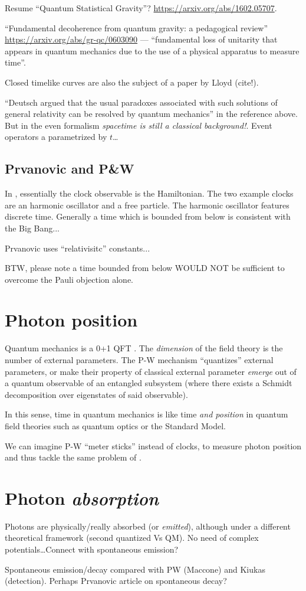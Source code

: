 Resume ``Quantum Statistical Gravity''? \url{https://arxiv.org/abs/1602.05707}.

``Fundamental decoherence from quantum gravity: a pedagogical review''
\url{https://arxiv.org/abs/gr-qc/0603090} ---
``fundamental loss of unitarity
that appears in quantum mechanics
due to the use of a physical apparatus to measure time''.

Closed timelike curves are also the subject of a paper by Lloyd (cite!).

``Deutsch argued that
the usual paradoxes associated with such solutions of general
relativity can be resolved by quantum mechanics''  in the reference above. But in the even formalism
\emph{spacetime is still a classical background!}. Event operators a parametrized by $t$\dots

\subsection{Prvanovic and P\&W}
In \cite{Prvanovic}, essentially the clock observable is the Hamiltonian.
The two example clocks are an harmonic oscillator and a free particle.
The harmonic oscillator features discrete time. Generally a time which is
{bounded from below}
is consistent with the Big Bang...

Prvanovic uses ``relativisitc'' constants...

BTW, please note a time bounded from below WOULD NOT be sufficient to overcome the Pauli objection alone.

\section{Photon position}

Quantum mechanics is a 0+1 QFT \parencite{QFT_0+1}.
The \emph{dimension} of the field theory is the number of external parameters.
The P-W mechanism ``quantizes'' external parameters, or make their property
of classical external parameter \emph{emerge} out of a quantum observable
of an entangled subsystem (where there exists a Schmidt decomposition over
eigenstates of said observable).

In this sense, time in quantum mechanics is like time \emph{and position}
in quantum field theories such as quantum optics or the Standard Model.

We can imagine P-W ``meter sticks'' instead of clocks, to measure
photon position and thus tackle the same problem of \cite{HawtonPhotonPosition}.

\section{Photon \emph{absorption}}

Photons are physically/really absorbed (or \emph{emitted}), although under a different theoretical framework
(second quantized Vs QM). No need of complex potentials\dots Connect with spontaneous emission?

Spontaneous emission/decay compared with PW (Maccone) and Kiukas (detection).
Perhaps Prvanovic article on spontaneous decay?
